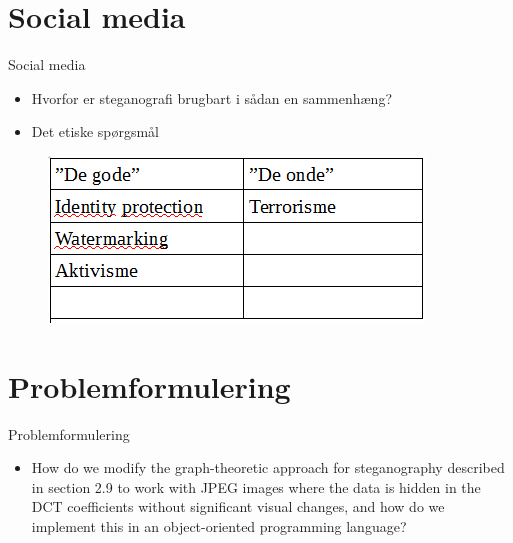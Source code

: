 \section{Social media}
\begin{frame}{Social media}{}
	\begin{itemize}
		\item Hvorfor er steganografi brugbart i sådan en sammenhæng?
		\item Det etiske spørgsmål		 
	\end{itemize}
	\begin{figure}[!H]
			\centering
			\includegraphics[width=.55\textwidth]{./Tessa/tabel.png}
	\end{figure}
\end{frame}

\section{Problemformulering}
\begin{frame}{Problemformulering}{}
	\begin{itemize}
		\item How do we modify the graph-theoretic approach for steganography described in section 2.9 to work with JPEG images where the data is hidden in the DCT coefficients without significant visual changes, and how do we implement this in an object-oriented programming language?
	\end{itemize}
\end{frame}
